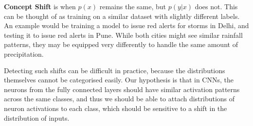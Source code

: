 \documentclass{article}
\begin{document}
        \textbf{Concept Shift} is when $p(x)$ remains the same, but $p(y | x)$ does not. This can be thought of as training on a similar dataset with slightly different labels. An example would be training a model to issue red alerts for storms in Delhi, and testing it to issue red alerts in Pune. While both cities might see similar rainfall patterns, they may be equipped very differently to handle the same amount of precipitation. 

        Detecting such shifts can be difficult in practice, because the distributions themselves cannot be categorised easily. Our hypothesis is that in CNNs, the neurons from the fully connected layers should have similar activation patterns across the same classes, and thus we should be able to attach distributions of neuron activations to each class, which should be sensitive to a shift in the distribution of inputs. 
        
\end{document}
